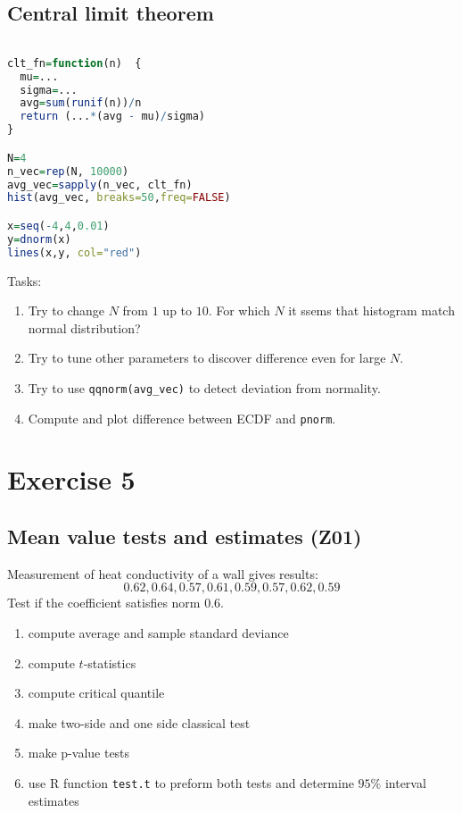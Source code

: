 \documentclass[4pt]{article}
\begin{document}
\subsection{Central limit theorem}
\begin{lstlisting}[language=r]

clt_fn=function(n)  {
  mu=...
  sigma=...
  avg=sum(runif(n))/n
  return (...*(avg - mu)/sigma)
}  

N=4
n_vec=rep(N, 10000)
avg_vec=sapply(n_vec, clt_fn)
hist(avg_vec, breaks=50,freq=FALSE)

x=seq(-4,4,0.01)
y=dnorm(x)
lines(x,y, col="red")
\end{lstlisting}
Tasks:
\begin{enumerate}
 \item Try to change $N$ from $1$ up to $10$. For which $N$ it ssems that histogram match normal distribution?
 \item Try to tune other parameters to discover difference even for large $N$.
 \item Try to use \verb'qqnorm(avg_vec)' to detect deviation from normality.
 \item Compute and plot difference between ECDF and \verb'pnorm'.
\end{enumerate}

\pagebreak


\section{Exercise 5}

\subsection{Mean value tests and estimates (Z01)}
Measurement of heat conductivity of a wall gives results:
\[
    0.62, 0.64, 0.57,0.61, 0.59, 0.57, 0.62, 0.59
\]
Test if the coefficient satisfies norm $0.6$.

\begin{enumerate}
 \item compute average and sample standard deviance
 \item compute $t$-statistics
 \item compute critical quantile
 \item make two-side and one side classical test
 \item make p-value tests
 \item use R function \verb'test.t' to preform both tests and determine $95\%$ interval estimates
\end{enumerate}
\end{document}
